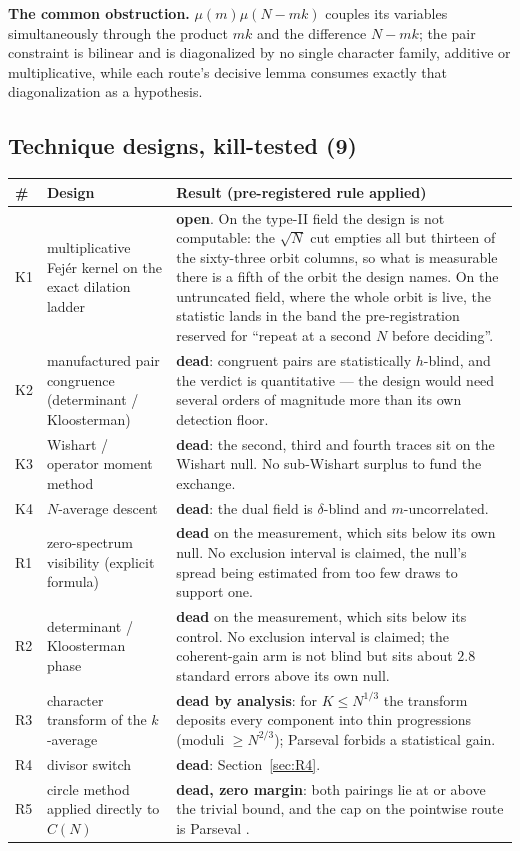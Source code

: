 \documentclass[11pt,a4paper]{article}
\theoremstyle{plain}
\theoremstyle{definition}
\theoremstyle{remark}
\begin{document}
\noindent
\textbf{The common obstruction.} $\mu(m)\mu(N-mk)$ couples its
variables simultaneously through the product $mk$ and the difference
$N-mk$; the pair constraint is bilinear and is diagonalized by no
single character family, additive or multiplicative, while each
route's decisive lemma consumes exactly that diagonalization as a
hypothesis.

\subsection{Technique designs, kill-tested (9)}

\begin{longtable}{p{}p{}p{}}
\hline
\# & Design & Result (pre-registered rule applied)\\
\hline
\endhead
K1 & multiplicative Fej\'er kernel on the exact dilation ladder &
 \textbf{open}. On the type-II field the design is not computable: the
 $\sqrt N$ cut empties all but thirteen of the sixty-three orbit
 columns, so what is measurable there is a fifth of the orbit the
 design names. On the untruncated field, where the whole orbit is
 live, the statistic lands in the band the pre-registration reserved
 for ``repeat at a second $N$ before deciding''.\\
K2 & manufactured pair congruence (determinant / Kloosterman) &
 \textbf{dead}: congruent pairs are statistically $h$-blind, and the
 verdict is quantitative --- the design would need several orders of
 magnitude more than its own detection floor.\\
K3 & Wishart / operator moment method &
 \textbf{dead}: the second, third and fourth traces sit on the Wishart
 null. No sub-Wishart surplus to fund the exchange.\\
K4 & $N$-average descent &
 \textbf{dead}: the dual field is $\delta$-blind and
 $m$-uncorrelated.\\
R1 & zero-spectrum visibility (explicit formula) &
 \textbf{dead} on the measurement, which sits below its own null. No
 exclusion interval is claimed, the null's spread being estimated from
 too few draws to support one.\\
R2 & determinant / Kloosterman phase &
 \textbf{dead} on the measurement, which sits below its control. No
 exclusion interval is claimed; the coherent-gain arm is not blind but
 sits about $2.8$ standard errors above its own null.\\
R3 & character transform of the $k$-average &
 \textbf{dead by analysis}: for $K\le N^{1/3}$ the transform deposits
 every component into thin progressions (moduli $\ge N^{2/3}$);
 Parseval forbids a statistical gain.\\
R4 & divisor switch &
 \textbf{dead}: Section~\ref{sec:R4}.\\
R5 & circle method applied directly to $C(N)$ &
 \textbf{dead, zero margin}: both pairings lie at or above the trivial
 bound, and the cap on the pointwise route is Parseval
 \cite[Prop.~25]{P2}.\\
\hline
\end{longtable}
\end{document}
